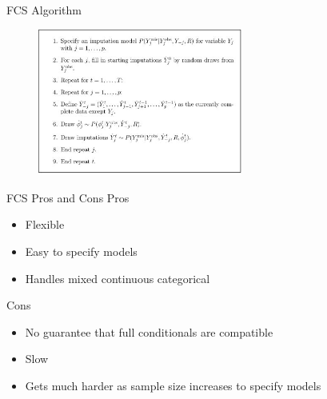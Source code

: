 \begin{frame}{FCS Algorithm}
  \begin{figure}[h!]
  \centering
    \includegraphics[width=0.6\textwidth]{fcs_algo}
\label{fig:fcsexample}
\end{figure}
\end{frame}

\begin{frame}{FCS Pros and Cons}
Pros
 \begin{itemize}
  \item Flexible
  \item Easy to specify models
  \item Handles mixed continuous categorical
 \end{itemize}

 Cons
 \begin{itemize}
  \item No guarantee that full conditionals are compatible
  \item Slow
  \item Gets much harder as sample size increases to specify models
 \end{itemize}

\end{frame}

